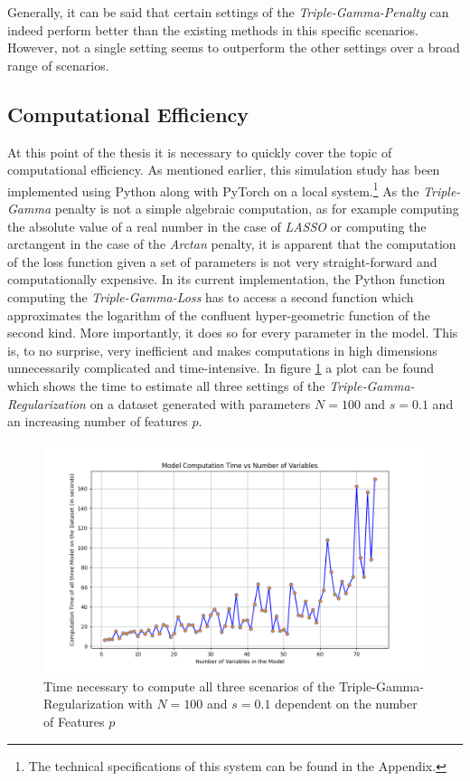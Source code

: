 \documentclass[12pt,a4paper]{article}
\begin{document}
Generally, it can be said that certain settings of the \textit{Triple-Gamma-Penalty} can indeed perform better than the existing methods in this specific scenarios. However, not a single setting seems to outperform the other settings over a broad range of scenarios. 


\newpage
\subsection{Computational Efficiency}
At this point of the thesis it is necessary to quickly cover the topic of computational efficiency. As mentioned earlier, this simulation study has been implemented using Python along with PyTorch on a local system.\footnote{The technical specifications of this system can be found in the Appendix.} As the \textit{Triple-Gamma} penalty is not a simple algebraic computation, as for example computing the absolute value of a real number in the case of \textit{LASSO} or computing the arctangent in the case of the \textit{Arctan} penalty, it is apparent that the computation of the loss function given a set of parameters is not very straight-forward and computationally expensive. In its current implementation, the Python function computing the \textit{Triple-Gamma-Loss} has to access a second function which approximates the logarithm of the confluent hyper-geometric  function of the second kind. More importantly, it does so for every parameter in the model. This is, to no surprise, very inefficient and makes computations in high dimensions unnecessarily complicated and time-intensive. In figure \ref{fig:ComputationTime} a plot can be found which shows the time to estimate all three settings of the \textit{Triple-Gamma-Regularization} on a dataset generated with parameters $N=100$ and $s=0.1$ and an increasing number of features $p$.\\

\begin{figure}[H]
\centering
\includegraphics[scale=0.6]{../02_simulation/021_simulation_figures/ComputationTime_Example.png}
\caption{Time necessary to compute all three scenarios of the Triple-Gamma-Regularization with $N=100$ and $s=0.1$ dependent on the number of Features $p$}
\label{fig:ComputationTime}
\end{figure} 	
\end{document}
